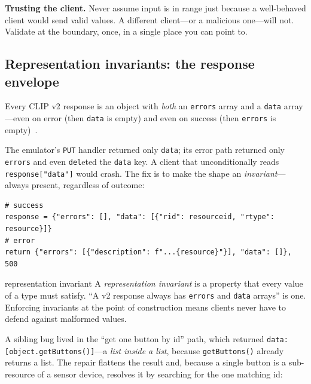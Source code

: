 \documentclass[11pt,a4paper]{article}
\newcommand{\code}[1]{\texttt{#1}}
\begin{document}
\begin{pitfall}
\textbf{Trusting the client.} Never assume input is in range just because a
well-behaved client would send valid values. A different client---or a
malicious one---will not. Validate at the boundary, once, in a single place you
can point to.
\end{pitfall}

\subsection{Representation invariants: the response envelope}

\begin{specbox}
Every CLIP v2 response is an object with \emph{both} an \code{errors} array and
a \code{data} array---even on error (then \code{data} is empty) and even on
success (then \code{errors} is empty)~\cite{openhue,huev2}.
\end{specbox}

The emulator's \code{PUT} handler returned only \code{data}; its error path
returned only \code{errors} and even \code{del}eted the \code{data} key. A
client that unconditionally reads \code{response["data"]} would crash. The fix
is to make the shape an \emph{invariant}---always present, regardless of
outcome:

\begin{lstlisting}
# success
response = {"errors": [], "data": [{"rid": resourceid, "rtype": resource}]}
# error
return {"errors": [{"description": f"...{resource}"}], "data": []}, 500
\end{lstlisting}

\begin{defbox}{representation invariant}
A \emph{representation invariant} is a property that every value of a type must
satisfy. ``A v2 response always has \code{errors} and \code{data} arrays'' is
one. Enforcing invariants at the point of construction means clients never have
to defend against malformed values.
\end{defbox}

A sibling bug lived in the ``get one button by id'' path, which returned
\code{data:[object.getButtons()]}---a \emph{list inside a list}, because
\code{getButtons()} already returns a list. The repair flattens the result and,
because a single button is a sub-resource of a sensor device, resolves it by
searching for the one matching id:
\end{document}
